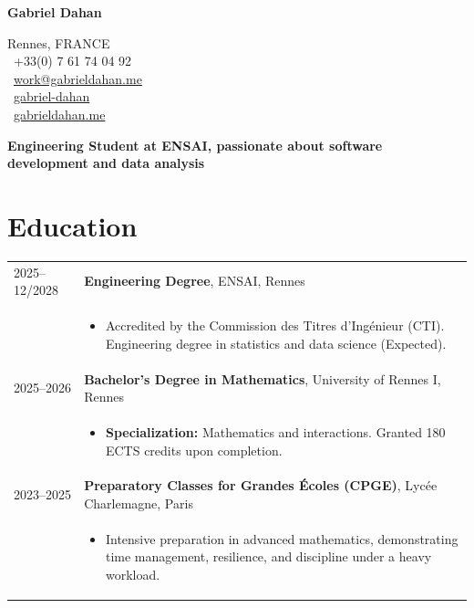 \documentclass[11pt,a4paper]{article}
\begin{document}
\begin{minipage}[b]{0.6\textwidth}
    {\Huge \textbf{Gabriel Dahan}}
\end{minipage}
\hfill
\begin{minipage}[b]{0.35\textwidth}
    \raggedleft \small
    Rennes, FRANCE \\
    \faPhone \ +33(0) 7 61 74 04 92 \\
    \faEnvelope \ \href{mailto:work@gabrieldahan.me}{work@gabrieldahan.me} \\
    \faLinkedin \ \href{https://www.linkedin.com/in/gabriel-dahan/}{gabriel-dahan} \\
    \faGlobe \ \href{https://gabrieldahan.me/}{gabrieldahan.me}
\end{minipage}

\vspace{0.6cm}

\textbf{Engineering Student at ENSAI, passionate about software development and data analysis}

\vspace{0.4cm}

\section*{Education}

\begin{tabularx}{\textwidth}{@{}p{2.5cm} X@{}}
2025--12/2028 & \textbf{Engineering Degree}, ENSAI, Rennes \\
& \vspace{-0.2cm}
  \begin{itemize}[leftmargin=0.4cm, itemsep=1pt, topsep=0pt]
    \item Accredited by the Commission des Titres d'Ingénieur (CTI). Engineering degree in statistics and data science (Expected).
  \end{itemize} \\

2025--2026 & \textbf{Bachelor's Degree in Mathematics}, University of Rennes I, Rennes \\
& \vspace{-0.2cm}
  \begin{itemize}[leftmargin=0.4cm, itemsep=1pt, topsep=0pt]
    \item \textbf{Specialization:} Mathematics and interactions. Granted 180 ECTS credits upon completion.
  \end{itemize} \\

2023--2025 & \textbf{Preparatory Classes for Grandes Écoles (CPGE)}, Lycée Charlemagne, Paris \\
& \vspace{-0.2cm}
  \begin{itemize}[leftmargin=0.4cm, itemsep=1pt, topsep=0pt]
    \item Intensive preparation in advanced mathematics, demonstrating time management, resilience, and discipline under a heavy workload.
  \end{itemize} \\
\end{tabularx}
\end{document}
